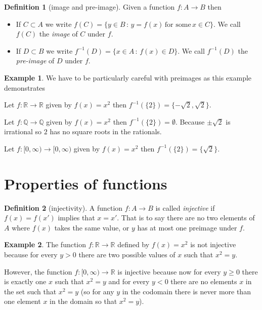 \documentclass[
]{book}
\theoremstyle{definition}
\newtheorem{definition}{Definition}[chapter]
\theoremstyle{definition}
\newtheorem{example}{Example}[chapter]
\theoremstyle{definition}
\theoremstyle{definition}
\theoremstyle{remark}
\begin{document}
\begin{definition}[image and pre-image]

Given a function \(f:A \rightarrow B\) then

\begin{itemize}
\item
  If \(C \subset A\) we write \(f(C) = \{y \in B \,:\, y = f(x) \, \mbox{for some} \, x \in C\}\). We call \(f(C)\) the \emph{image} of \(C\) under \(f\).
\item
  If \(D \subset B\) we write \(f^{-1}(D) = \{ x \in A \,:\, f(x) \in D\}\). We call \(f^{-1}(D)\) the \emph{pre-image} of \(D\) under \(f\).
\end{itemize}

\end{definition}

\begin{example}
We have to be particularly careful with preimages as this example demonstrates

Let \(f: \mathbb{R} \rightarrow \mathbb{R}\) given by \(f(x) = x^2\) then \(f^{-1}(\{2\}) = \{-\sqrt{2}, \sqrt{2}\}\).

Let \(f: \mathbb{Q} \rightarrow \mathbb{Q}\) given by \(f(x) = x^2\) then \(f^{-1}(\{2\})= \emptyset\). Because \(\pm \sqrt{2}\) is irrational so \(2\) has no square roots in the rationals.

Let \(f: [0, \infty) \rightarrow [0, \infty)\) given by \(f(x)=x^2\) then \(f^{-1}(\{2\}) = \{\sqrt{2}\}\).
\end{example}

\section{Properties of functions}\label{properties-of-functions}

\begin{definition}[injectivity]
A function \(f:A\rightarrow B\) is called \emph{injective} if \(f(x)=f(x')\) implies that \(x=x'\). That is to say there are no two elements of \(A\) where \(f(x)\) takes the same value, or \(y\) has at most one preimage under \(f\).
\end{definition}

\begin{example}
The function \(f: \mathbb{R} \rightarrow \mathbb{R}\) defined by \(f(x) =x^2\) is not injective because for every \(y>0\) there are two possible values of \(x\) such that \(x^2 = y\).

However, the function \(f: [0, \infty) \rightarrow \mathbb{R}\) is injective because now for every \(y\geq 0\) there is exactly one \(x\) such that \(x^2=y\) and for every \(y <0\) there are no elements \(x\) in the set such that \(x^2 = y\) (so for any \(y\) in the codomain there is never more than one element \(x\) in the domain so that \(x^2 = y\)).
\end{example}
\end{document}
